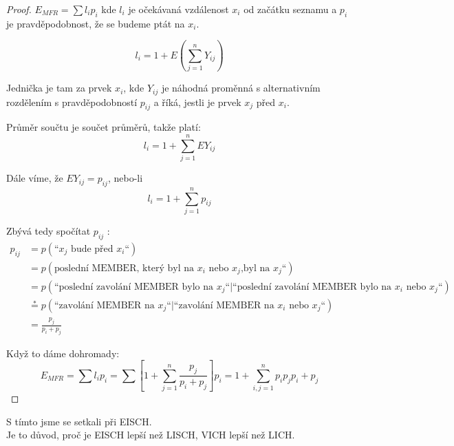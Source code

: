 \begin{proof}
$E_{MFR} = \sum l_i p_i$
kde $l_i$ je očekávaná vzdálenost $x_i$ od začátku seznamu a $p_i$ je
pravděpodobnost, že se budeme ptát na $x_i$.
\par
$$
l_i = 1 + E(\sum\limits_{j=1}^n Y_{ij})
$$

Jednička je tam za prvek $x_i$, kde $Y_{ij}$ je náhodná proměnná s 
alternativním rozdělením s pravděpodobností $p_{ij}$ a
říká, jestli je prvek $x_j$ před $x_i$.
\par
Průměr součtu je součet průměrů, takže platí: \\
$$
l_i = 1 + \sum\limits_{j=1}^n EY_{ij}
$$

Dále víme, že $EY_{ij} = p_{ij}$, nebo-li
$$
l_i = 1 + \sum\limits_{j=1}^n p_{ij}
$$
\par

Zbývá tedy spočítat $p_{ij}$ : \\

\begin{equation}
\begin{split}
p_{ij} & = p(\text{``} x_j \text{ bude před } x_i \text{``}) \\
& = p(\text{poslední MEMBER, který byl na }x_i \text{ nebo } x_j\text{,}
\text{byl na } x_j \text{``}) \\
& = p(\text{``poslední zavolání MEMBER bylo na } x_j \text{``} | 
\text{``poslední zavolání MEMBER bylo na } x_i \text{ nebo } x_j \text{``}) \\
& \stackrel{*}{=} p(\text{``zavolání MEMBER na } x_j \text{``} | 
\text{``zavolání MEMBER na } x_i \text{ nebo } x_j \text{``}) \\
& = \frac{p_j}{p_i + p_j}
\end{split}
\end{equation}

Když to dáme dohromady:
$$
E_{MFR} = \sum l_i p_i = \sum [1 + \sum\limits_{j=1}^n \frac{p_j}{p_i +
p_j}] p_i = 1 + \sum\limits_{i, j = 1}^{n} {p_i p_j}{p_i + p_j}
$$
\end{proof}

\begin{pozn}
S tímto jsme se setkali při EISCH. \\
Je to důvod, proč je EISCH lepší než LISCH, VICH lepší než LICH.
\end{pozn}


